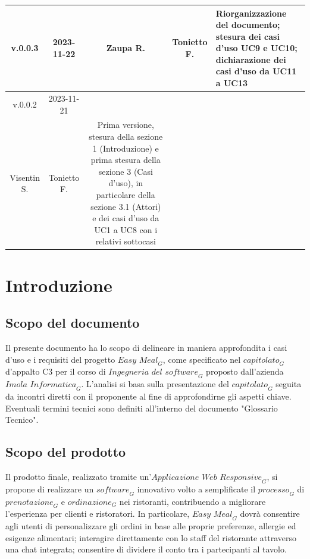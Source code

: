 \documentclass[12pt, oneside]{article}
\begin{document}
\begin{longtable}{|c|c|c|c|p{7cm}|}
\hline
v.0.0.3 & 2023-11-22 & Zaupa R. & Tonietto F. & Riorganizzazione del documento; stesura dei casi d'uso UC9 e UC10; dichiarazione dei casi d'uso da UC11 a UC13 \\
\hline
v.0.0.2 & 2023-11-21 & 
  \begin{tabular}[c]{@{}c@{}}
    Zaupa R. \\
    Visentin S.
  \end{tabular} 
  & Tonietto F. & Prima versione, stesura della sezione 1 (Introduzione) e prima stesura della sezione 3 (Casi d'uso), in particolare della sezione 3.1 (Attori) e dei casi d'uso da UC1 a UC8 con i relativi sottocasi\\
\hline
\end{longtable}
\newpage

\tableofcontents
\newpage

\section{Introduzione}
\subsection{Scopo del documento}
Il presente documento ha lo scopo di delineare in maniera approfondita i casi d'uso e i requisiti del progetto $\textit{Easy Meal}_G$, come specificato nel $\textit{capitolato}_G$ d'appalto C3 per il corso di $\textit{Ingegneria del software}_G$ proposto dall'azienda $\textit{Imola Informatica}_G$.
L'analisi si basa sulla presentazione del $\textit{capitolato}_G$ seguita da incontri diretti con il proponente al fine di approfondirne gli aspetti chiave. Eventuali termini tecnici sono definiti all'interno del documento "Glossario Tecnico".
\subsection{Scopo del prodotto}
Il prodotto finale, realizzato tramite un'$\textit{Applicazione Web Responsive}_G$, si propone di realizzare un $\textit{software}_G$ innovativo volto a semplificate il $\textit{processo}_G$ di $\textit{prenotazione}_G$ e $\textit{ordinazione}_G$ nei ristoranti, contribuendo a migliorare l'esperienza per clienti e ristoratori. In particolare, $\textit{Easy Meal}_G$ dovrà consentire agli utenti di personalizzare gli ordini in base alle proprie preferenze, allergie ed esigenze alimentari; interagire direttamente con lo staff del ristorante attraverso una chat integrata; consentire di dividere il conto tra i partecipanti al tavolo.
\end{document}
